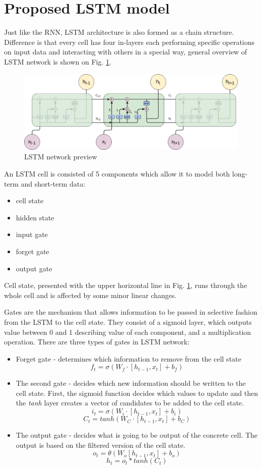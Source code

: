 \documentclass[11pt, a4paper]{article} %
\begin{document}
\section{Proposed LSTM model}

Just like the RNN, LSTM architecture is also formed as a chain structure. Difference is that every cell has four in-layers each performing specific operations on input data and interacting with others in a special way, general overview of LSTM network is shown on Fig. \ref{lstm}.
\begin{figure}
	\centering
	\includegraphics[scale=.4]{images/LSTM.png} %
	\caption{LSTM network preview}
	\label{lstm} 
\end{figure}

An LSTM cell is consisted of 5 components which allow it to model both long-term and short-term data:
\begin{itemize}
	\item cell state
	\item hidden state
	\item input gate 
	\item forget gate
	\item output gate 
\end{itemize}

Cell state, presented with the upper horizontal line in Fig. \ref{lstm}, runs through the whole cell and is affected by some minor linear changes.

Gates are the mechanism that allows information to be passed in selective fashion from the LSTM to the cell state. They consist of a sigmoid layer, which outputs value between 0 and 1 describing value of each component, and a multiplication operation.
There are three types of gates in LSTM network:
\begin{itemize}
	\item {Forget gate} - determines which information to remove from the cell state $$ f_{t} = \sigma (W_{f} \cdot [h_{t-1}, x_{t}] + b_{f}) $$
	\item {The second gate} - decides which new information should be written to the cell state. First, the sigmoid function decides which values to update and then the \emph{tanh} layer creates a vector of candidates to be added to the cell state. $$ i_{t} = \sigma (W_{i} \cdot [h_{t-1}, x_{t}] + b_{i}) $$ $$ C_{t} = tanh (W_{C} \cdot [h_{t-1}, x_{t}] + b_{C}) $$
	\item {The output gate} - decides what is going to be output of the concrete cell. The output is based on the filtered version of the cell state. $$ o_{t} = \theta (W_{o} [h_{t-1}, x_{t}] + b_{o}) $$ $$ h_{t} = o_{t} * tanh(C_{t})$$
\end{itemize}
\end{document}
